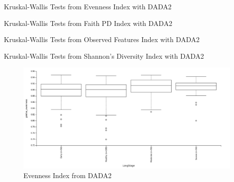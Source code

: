 \documentclass[a4paper]{article}
\begin{document}
            \begin{table}[p]
                \centering
                \caption{Kruskal-Wallis Tests from Evenness Index with DADA2}
                \label{tb:alpha-evenness-dada2}
            \end{table}

            \begin{table}[p]
                \centering
                \caption{Kruskal-Wallis Tests from Faith PD Index with DADA2}
                \label{tb:alpha-faith-dada2}
            \end{table}

            \begin{table}[p]
                \centering
                \caption{Kruskal-Wallis Tests from Observed Features Index with DADA2}
                \label{tb:alpha-observed-dada2}
            \end{table}

            \begin{table}[p]
                \centering
                \caption{Kruskal-Wallis Tests from Shannon's Diversity Index with DADA2}
                \label{tb:alpha-shannon-dada2}
            \end{table}

            \begin{figure}[p]
                \centering
                \includegraphics[width=0.8 \linewidth]{figures/AlphaDiversity/DADA2/evenness.png}
                \caption{Evenness Index from DADA2}
                \label{fig:evenness-dada2}
            \end{figure}
\end{document}
